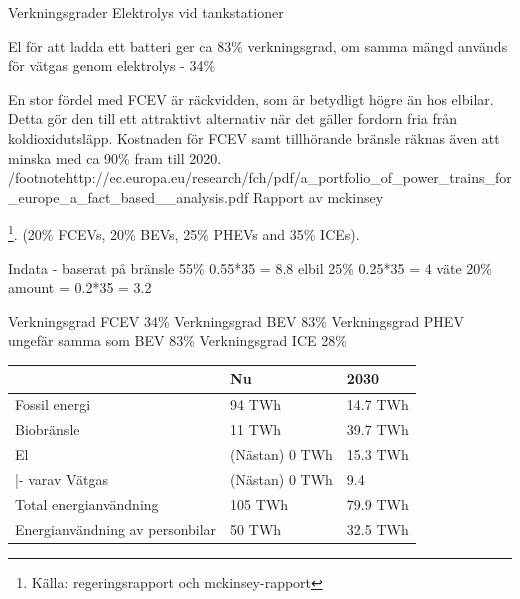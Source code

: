 \documentclass[a4paper,11pt,fleqn, titlepage]{article}
\begin{document}
Verkningsgrader
Elektrolys vid tankstationer

El för att ladda ett batteri ger ca 83\% verkningsgrad, om samma mängd används för vätgas genom elektrolys - 34\%

En stor fördel med FCEV är räckvidden, som är betydligt högre än hos elbilar. Detta gör den till ett attraktivt alternativ när det gäller fordorn fria från koldioxidutsläpp. Kostnaden för FCEV samt tillhörande bränsle räknas även att minska med ca 90\% fram till 2020. /footnote{http://ec.europa.eu/research/fch/pdf/a_portfolio_of_power_trains_for_europe_a_fact_based__analysis.pdf Rapport av mckinsey}

\footnote{Källa: regeringsrapport och mckinsey-rapport}.
(20\% FCEVs, 20\% BEVs, 25\% PHEVs and 35\% ICEs).

Indata - baserat på
bränsle 55\% 0.55*35 = 8.8
elbil 25\% 0.25*35 = 4
väte 20\% amount = 0.2*35 = 3.2

Verkningsgrad FCEV 34\%
Verkningsgrad BEV 83\%
Verkningsgrad PHEV ungefär samma som BEV 83\%
Verkningsgrad ICE 28\%

\begin{center}
	\label{tab:scen2energi}
	\begin{tabular}{ | l | l | l | }
	\hline
						& Nu		& 2030 \\ \hline
	Fossil energi				& 94 TWh	& 14.7 TWh \\ \hline
	Biobränsle				& 11 TWh	& 39.7 TWh \\ \hline %
	El					& (Nästan) 0 TWh &  15.3 TWh \\ \hline %
	|- varav Vätgas     & (Nästan) 0 TWh & 9.4 \\ \hline
	Total energianvändning		& 105 TWh	& 79.9 TWh \\ \hline
	Energianvändning av personbilar	& 50 TWh	& 32.5 TWh \\ \hline
	\end{tabular}
\end{center}


\printbibliography
\end{document}
